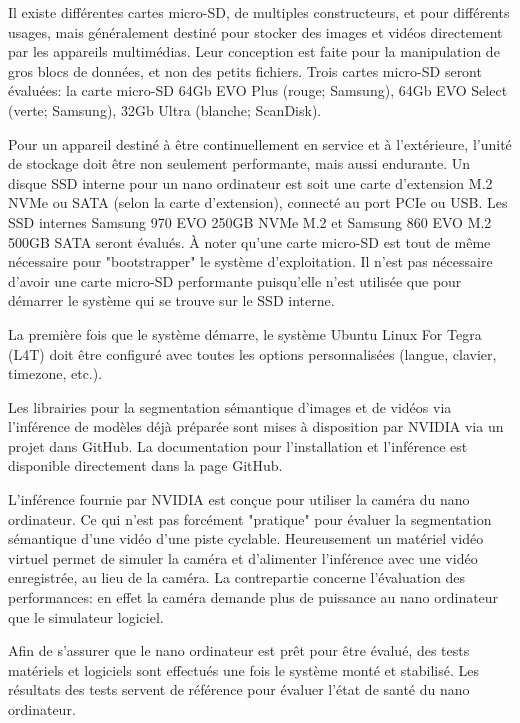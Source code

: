 \par Il existe différentes cartes micro-SD, de multiples constructeurs, et pour différents usages, mais généralement destiné pour stocker des images et vidéos directement par les appareils multimédias. Leur conception est faite pour la manipulation de gros blocs de données, et non des petits fichiers. Trois cartes micro-SD 
seront évaluées: la carte micro-SD 64Gb EVO Plus (rouge; Samsung), 64Gb EVO Select (verte; Samsung), 32Gb Ultra (blanche; ScanDisk).
\par Pour un appareil destiné à être continuellement en service et à l'extérieure, l'unité de stockage doit être non seulement performante, mais aussi endurante. Un disque SSD interne pour un nano ordinateur est soit une carte d'extension M.2 NVMe ou SATA (selon la carte d'extension), connecté au port PCIe ou USB. Les SSD internes 
Samsung 970 EVO 250GB NVMe M.2 et Samsung 860 EVO M.2 500GB SATA seront évalués. À noter qu'une carte micro-SD est tout de même nécessaire pour "bootstrapper" le système d'exploitation. Il n'est pas nécessaire d'avoir une carte micro-SD performante puisqu'elle n'est utilisée que pour démarrer le système qui se trouve sur le SSD interne. 
\par La première fois que le système démarre, le système Ubuntu Linux For Tegra (L4T) doit être configuré avec toutes les options personnalisées (langue, clavier, timezone, etc.).
\par Les librairies pour la segmentation sémantique 
d'images et de vidéos via l'inférence de modèles déjà préparée sont mises à disposition par NVIDIA via un projet dans GitHub. La documentation pour l'installation et l'inférence est disponible directement dans la page GitHub. 
\par L'inférence fournie par NVIDIA est conçue pour utiliser la caméra du nano ordinateur. Ce qui n'est pas forcément "pratique" pour évaluer la segmentation sémantique d'une vidéo d'une piste cyclable. Heureusement un matériel vidéo virtuel permet de simuler la caméra et d'alimenter l'inférence avec une vidéo enregistrée, au lieu de la caméra. La contrepartie concerne l'évaluation des performances:  en effet la caméra demande plus de puissance au nano ordinateur que le simulateur logiciel.
\par Afin de s'assurer que le nano ordinateur est prêt pour être évalué, des tests matériels et logiciels sont  effectués une fois le système monté et stabilisé. Les résultats des tests servent de référence pour évaluer l'état de santé du nano ordinateur. 